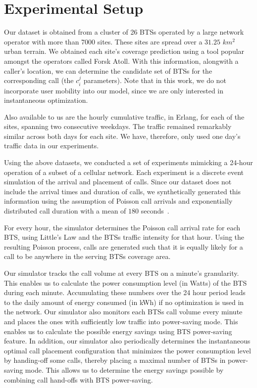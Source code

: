\section{Experimental Setup}
\label{sec:expermintalsetup}
Our dataset is obtained from a cluster of 26 BTSs operated by a large network operator with more than 7000 sites. These sites are spread over a $31.25$ $km^2$ urban terrain. We obtained each site's coverage prediction using a tool popular amongst the operators called Forsk Atoll. With this information, alongwith a caller's location, we can determine the candidate set of BTSs for the corresponding call (the $c_i^j$ parameters). Note that in this work, we do not incorporate user mobility into our model, since we are only interested in instantaneous optimization.

Also available to us are the hourly cumulative traffic, in Erlang, for each of the sites, spanning two consecutive weekdays. The traffic remained remarkably similar across both days for each site. We have, therefore, only used one day's traffic data in our experiments.

Using the above datasets, we conducted a set of experiments mimicking a 24-hour operation of a subset of a cellular network. Each experiment is a discrete event simulation of the arrival and placement of calls. Since our dataset does not include the arrival times and duration of calls, we synthetically generated this information using the assumption of Poisson call arrivals and exponentially distributed call duration with a mean of $180$ seconds~\cite{Gerla:1995:MMM:276418.276421}.

For every hour, the simulator determines the Poisson call arrival rate for each BTS, using Little's Law and the BTSs traffic intensity for that hour. Using the resulting Poisson process, calls are generated such that it is equally likely for a call to be anywhere in the serving BTSs coverage area.

Our simulator tracks the call volume at every BTS on a minute's granularity. This enables us to calculate the power consumption level (in Watts) of the BTS during each minute. Accumulating these numbers over the 24 hour period leads to the daily amount of energy consumed (in kWh) if no optimization is used in the network. Our simulator also monitors each BTSs call volume every minute and places the ones with sufficiently low traffic into power-saving mode. This enables us to calculate the possible energy savings using BTS power-saving feature. In addition, our simulator also periodically determines the instantaneous optimal call placement configuration that minimizes the power consumption level by handing-off some calls, thereby placing a maximal number of BTSs in power-saving mode. This allows us to determine the energy savings possible by combining call hand-offs with BTS power-saving.

